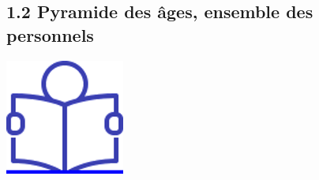\hypertarget{pyramide-des-ages-ensemble-des-personnels}{%
\subsection{1.2 Pyramide des âges, ensemble des
personnels}\label{pyramide-des-ages-ensemble-des-personnels}}

\href{../Docs/Notices/fiche_2.odt}{\includegraphics{icones/Notice.png}}


